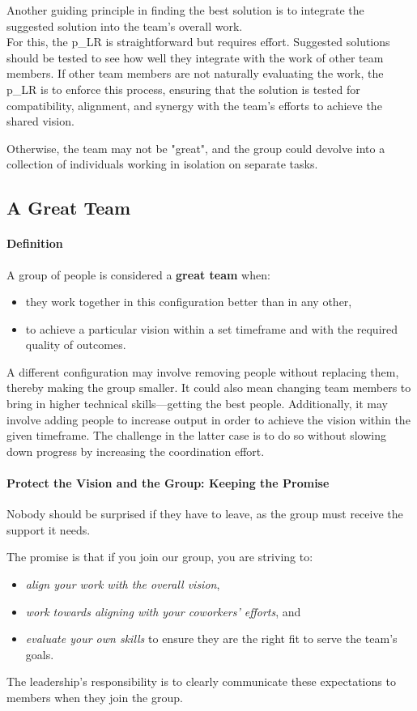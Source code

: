 Another guiding principle in finding the best solution is to integrate the suggested solution into the team's overall work.\\

For this, the \gls{p_LR} is straightforward but requires effort. Suggested solutions should be tested to see how well they integrate with the work of other team members. If other team members are not naturally evaluating the work, the \gls{p_LR} is to enforce this process, ensuring that the solution is tested for compatibility, alignment, and synergy with the team's efforts to achieve the shared vision. 

Otherwise, the team may not be "great", and the group could devolve into a collection of individuals working in isolation on separate tasks.

\subsection{A Great Team} \label{responsibility__great}

\paragraph{Definition}
A group of people is considered a \textbf{great team} when:
\begin{itemize}
	\item they work together in this configuration better than in any other,
	\item to achieve a particular vision within a set timeframe and with the required quality of outcomes.
\end{itemize}

A different configuration may involve removing people without replacing them, thereby making the group smaller. It could also mean changing team members to bring in higher technical skills—getting the best people. Additionally, it may involve adding people to increase output in order to achieve the vision within the given timeframe. The challenge in the latter case is to do so without slowing down progress by increasing the coordination effort.

\paragraph{Protect the Vision and the Group: Keeping the Promise}
\begin{center}
	Nobody should be surprised if they have to leave, as the group must receive the support it needs.
\end{center}
The promise is that if you join our group, you are striving to:
\begin{itemize}
	\item \textit{align your work with the overall vision},
	\item \textit{work towards aligning with your coworkers' efforts}, and
	\item \textit{evaluate your own skills} to ensure they are the right fit to serve the team's goals.
\end{itemize}
The leadership's responsibility is to clearly communicate these expectations to members when they join the group.\\

